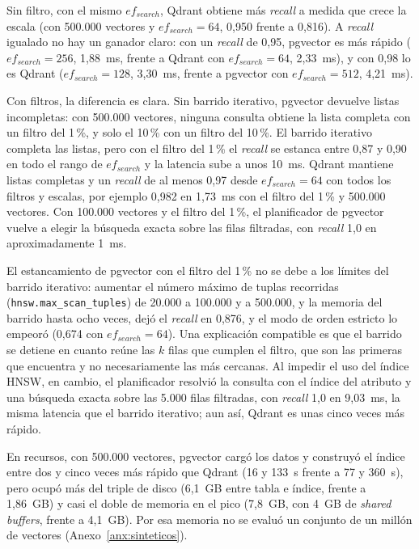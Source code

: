 

Sin filtro, con el mismo $ef_{search}$, Qdrant obtiene más \textit{recall} a medida que crece la escala (con 500.000 vectores y $ef_{search} = 64$, 0,950 frente a 0,816). A \textit{recall} igualado no hay un ganador claro: con un \textit{recall} de 0,95, pgvector es más rápido ($ef_{search} = 256$, 1,88~ms, frente a Qdrant con $ef_{search} = 64$, 2,33~ms), y con 0,98 lo es Qdrant ($ef_{search} = 128$, 3,30~ms, frente a pgvector con $ef_{search} = 512$, 4,21~ms).

Con filtros, la diferencia es clara. Sin barrido iterativo, pgvector devuelve listas incompletas: con 500.000 vectores, ninguna consulta obtiene la lista completa con un filtro del 1\,\%, y solo el 10\,\% con un filtro del 10\,\%. El barrido iterativo completa las listas, pero con el filtro del 1\,\% el \textit{recall} se estanca entre 0,87 y 0,90 en todo el rango de $ef_{search}$ y la latencia sube a unos 10~ms. Qdrant mantiene listas completas y un \textit{recall} de al menos 0,97 desde $ef_{search} = 64$ con todos los filtros y escalas, por ejemplo 0,982 en 1,73~ms con el filtro del 1\,\% y 500.000 vectores. Con 100.000 vectores y el filtro del 1\,\%, el planificador de pgvector vuelve a elegir la búsqueda exacta sobre las filas filtradas, con \textit{recall} 1,0 en aproximadamente 1~ms.

El estancamiento de pgvector con el filtro del 1\,\% no se debe a los límites del barrido iterativo: aumentar el número máximo de tuplas recorridas (\texttt{hnsw.max\_scan\_tuples}) de 20.000 a 100.000 y a 500.000, y la memoria del barrido hasta ocho veces, dejó el \textit{recall} en 0,876, y el modo de orden estricto lo empeoró (0,674 con $ef_{search} = 64$). Una explicación compatible es que el barrido se detiene en cuanto reúne las $k$ filas que cumplen el filtro, que son las primeras que encuentra y no necesariamente las más cercanas. Al impedir el uso del índice HNSW, en cambio, el planificador resolvió la consulta con el índice del atributo y una búsqueda exacta sobre las 5.000 filas filtradas, con \textit{recall} 1,0 en 9,03~ms, la misma latencia que el barrido iterativo; aun así, Qdrant es unas cinco veces más rápido.

En recursos, con 500.000 vectores, pgvector cargó los datos y construyó el índice entre dos y cinco veces más rápido que Qdrant (16 y 133~s frente a 77 y 360~s), pero ocupó más del triple de disco (6,1~GB entre tabla e índice, frente a 1,86~GB) y casi el doble de memoria en el pico (7,8~GB, con 4~GB de \textit{shared buffers}, frente a 4,1~GB). Por esa memoria no se evaluó un conjunto de un millón de vectores (Anexo~\ref{anx:sinteticos}).

